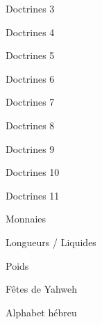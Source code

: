 \documentclass[11pt]{book}
\begin{document}
\begin{center}Doctrines 3\end{center}\clearpage
\begin{center}Doctrines 4\end{center}\clearpage
\begin{center}Doctrines 5\end{center}\clearpage
\begin{center}Doctrines 6\end{center}\clearpage
\begin{center}Doctrines 7\end{center}\clearpage
\begin{center}Doctrines 8\end{center}\clearpage
\begin{center}Doctrines 9\end{center}\clearpage
\begin{center}Doctrines 10\end{center}\clearpage
\begin{center}Doctrines 11\end{center}\clearpage
{}\clearpage
\begin{center}Monnaies\end{center}\clearpage
{}\clearpage
\begin{center}Longueurs / Liquides\end{center}\clearpage
{}\clearpage
\begin{center}Poids\end{center}\clearpage
{}\clearpage
\begin{center}Fêtes de Yahweh\end{center}\clearpage
{}\clearpage
\begin{center}Alphabet hébreu\end{center}\clearpage
\end{document}
